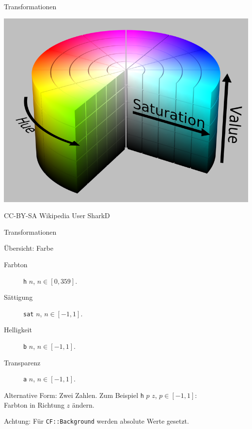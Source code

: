 \documentclass{beamer}
\theoremstyle{example}
\begin{document}
\begin{frame}{Transformationen}
\begin{center}
\includegraphics[width=0.7\linewidth]{./images/HSV.png}
\end{center}
\hfill{{\tiny CC-BY-SA Wikipedia User SharkD}}
\end{frame}

\begin{frame}{Transformationen}
\begin{block}{Übersicht: Farbe}
  \begin{description}
  \item[Farbton] \lstinline!h! {\small $n$}, $n\in [0,359]$. 
  \item[Sättigung] \lstinline!sat! {\small $n$}, $n\in [-1,1]$. 
  \item[Helligkeit] \lstinline!b! {\small $n$}, $n\in [-1,1]$.
  \item[Transparenz] \lstinline!a! {\small $n$}, $n\in [-1,1]$.
  \end{description}
\end{block}\pause
Alternative Form: Zwei Zahlen. Zum Beispiel \lstinline!h! {\small $p$ $z$}, $p\in [-1,1]$:\\ Farbton in Richtung $z$ ändern.

\alert{Achtung:} Für \lstinline!CF::Background! werden absolute Werte gesetzt.
\end{frame}
\end{document}
